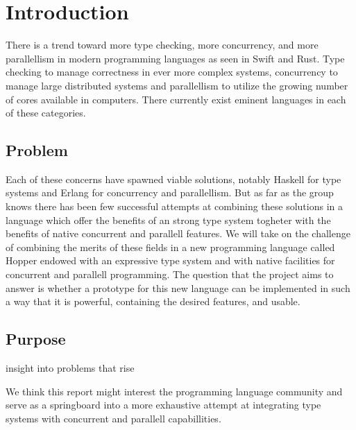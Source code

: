 \chapter{Introduction}


There is a trend toward more type checking, more concurrency, and more parallellism in modern programming languages as seen in Swift\cite{swift} and Rust\cite{rust}. Type checking to manage correctness in ever more complex systems, concurrency to manage large distributed systems and parallellism to utilize the growing number of cores available in computers. There currently exist eminent languages in each of these categories.

\section{Problem}

Each of these concerns have spawned viable solutions, notably Haskell\cite{haskell} for type systems and Erlang\cite{erlang} for concurrency and parallellism. But as far as the group knows there has been few successful attempts at combining these solutions in a language which offer the benefits of an strong type system togheter with the benefits of native concurrent and parallell features. We will take on the challenge of combining the merits of these fields in a new programming language called Hopper endowed with an expressive type system and with native facilities for concurrent and parallell programming. The question that the project aims to answer is whether a prototype for this new language can be implemented in such a way that it is powerful, containing the desired features, and usable.

\section{Purpose}




insight into problems that rise


We think this report might interest the programming language community and serve as a springboard into a more exhaustive attempt at integrating type systems with concurrent and parallell capabillities.

